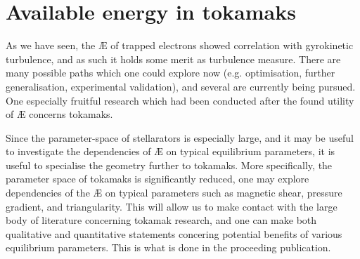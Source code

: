 \chapter[Available energy in tokamaks]{Available energy in tokamaks}
\label{chap: AE-TE}
As we have seen, the \AE{} of trapped electrons showed correlation with gyrokinetic turbulence, and as such it holds some merit as turbulence measure. There are many possible paths which one could explore now (e.g. optimisation, further generalisation, experimental validation), and several are currently being pursued. One especially fruitful research which had been conducted after the found utility of \AE{} concerns tokamaks. \par 
Since the parameter-space of stellarators is especially large, and it may be useful to investigate the dependencies of \AE{} on typical equilibrium parameters, it is useful to specialise the geometry further to tokamaks. More specifically, the parameter space of tokamaks is significantly reduced, one may explore dependencies of the \AE{} on typical parameters such as magnetic shear, pressure gradient, and triangularity. This will allow us to make contact with the large body of literature concerning tokamak research, and one can make both qualitative and quantitative statements concering potential benefits of various equilibrium parameters. This is what is done in the proceeding publication.
\vfill \newpage

